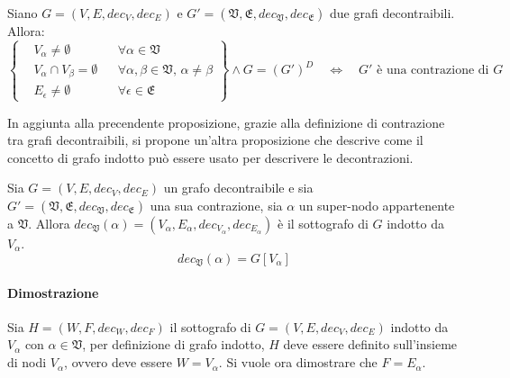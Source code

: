 \begin{proposition}
    Siano $G = (V, E, dec_V, dec_E)$ e $G' = (\mathfrak{V}, \mathfrak{E}, dec_{\mathfrak{V}}, dec_{\mathfrak{E}})$
    due grafi decontraibili. Allora:
    \begin{equation*}
        \left\{
        \begin{aligned}
            &V_\alpha \neq \emptyset  &&\forall \alpha \in \mathfrak{V} \\
            &V_{\alpha} \cap V_{\beta} = \emptyset &&\forall \alpha, \beta \in \mathfrak{V}, \, \alpha \neq \beta \\
            &E_{\epsilon} \neq \emptyset  &&\forall \epsilon \in \mathfrak{E}
        \end{aligned}
        \right\}
        \land G = (G')^D \quad \Longleftrightarrow \quad G' \text{ è una contrazione di } G
    \end{equation*}
\end{proposition}

In aggiunta alla precendente proposizione, grazie alla definizione di contrazione tra grafi decontraibili,
si propone un'altra proposizione che descrive come il concetto di grafo indotto pu\`o essere usato per descrivere
le decontrazioni.

\begin{proposition}
Sia $G=(V, E, dec_V, dec_E)$ un grafo decontraibile e sia \\
$G' = (\mathfrak{V}, \mathfrak{E}, dec_{\mathfrak{V}}, dec_{\mathfrak{E}})$ una sua contrazione, sia $\alpha$ un
super-nodo appartenente a $\mathfrak{V}$.
Allora $dec_{\mathfrak{V}}(\alpha) = (V_\alpha, E_\alpha, dec_{V_\alpha}, dec_{E_\alpha})$ \`e il sottografo
di $G$ indotto da $V_\alpha$.
\begin{equation*}
    dec_{\mathfrak{V}}(\alpha) = G[V_\alpha]
\end{equation*}
\end{proposition}

\paragraph{Dimostrazione}
Sia $H = (W, F, dec_W, dec_F)$ il sottografo di $G = (V, E, dec_V, dec_E)$ indotto da $V_\alpha$ con
$\alpha \in \mathfrak{V}$, per definizione di grafo indotto, $H$ deve essere definito sull'insieme di nodi
$V_\alpha$, ovvero deve essere $W = V_\alpha$.
Si vuole ora dimostrare che $F = E_\alpha$. \newline

